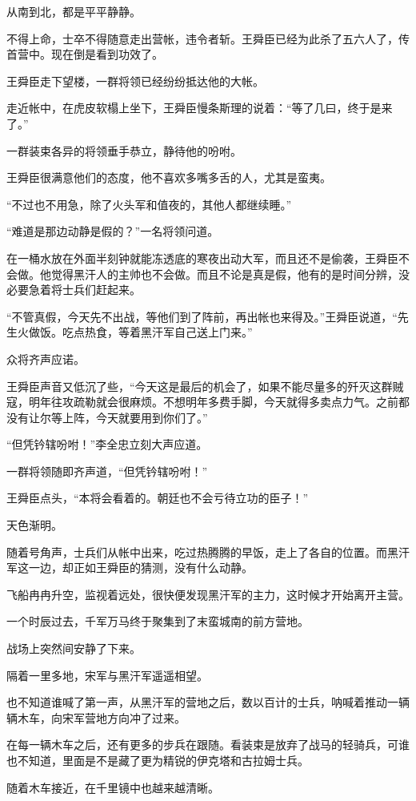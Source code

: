 从南到北，都是平平静静。

不得上命，士卒不得随意走出营帐，违令者斩。王舜臣已经为此杀了五六人了，传首营中。现在倒是看到功效了。

王舜臣走下望楼，一群将领已经纷纷抵达他的大帐。

走近帐中，在虎皮软榻上坐下，王舜臣慢条斯理的说着：“等了几曰，终于是来了。”

一群装束各异的将领垂手恭立，静待他的吩咐。

王舜臣很满意他们的态度，他不喜欢多嘴多舌的人，尤其是蛮夷。

“不过也不用急，除了火头军和值夜的，其他人都继续睡。”

“难道是那边动静是假的？”一名将领问道。

在一桶水放在外面半刻钟就能冻透底的寒夜出动大军，而且还不是偷袭，王舜臣不会做。他觉得黑汗人的主帅也不会做。而且不论是真是假，他有的是时间分辨，没必要急着将士兵们赶起来。

“不管真假，今天先不出战，等他们到了阵前，再出帐也来得及。”王舜臣说道，“先生火做饭。吃点热食，等着黑汗军自己送上门来。”

众将齐声应诺。

王舜臣声音又低沉了些，“今天这是最后的机会了，如果不能尽量多的歼灭这群贼寇，明年往攻疏勒就会很麻烦。不想明年多费手脚，今天就得多卖点力气。之前都没有让尔等上阵，今天就要用到你们了。”

“但凭钤辖吩咐！”李全忠立刻大声应道。

一群将领随即齐声道，“但凭钤辖吩咐！”

王舜臣点头，“本将会看着的。朝廷也不会亏待立功的臣子！”

天色渐明。

随着号角声，士兵们从帐中出来，吃过热腾腾的早饭，走上了各自的位置。而黑汗军这一边，却正如王舜臣的猜测，没有什么动静。

飞船冉冉升空，监视着远处，很快便发现黑汗军的主力，这时候才开始离开主营。

一个时辰过去，千军万马终于聚集到了末蛮城南的前方营地。

战场上突然间安静了下来。

隔着一里多地，宋军与黑汗军遥遥相望。

也不知道谁喊了第一声，从黑汗军的营地之后，数以百计的士兵，呐喊着推动一辆辆木车，向宋军营地方向冲了过来。

在每一辆木车之后，还有更多的步兵在跟随。看装束是放弃了战马的轻骑兵，可谁也不知道，里面是不是藏了更为精锐的伊克塔和古拉姆士兵。

随着木车接近，在千里镜中也越来越清晰。

